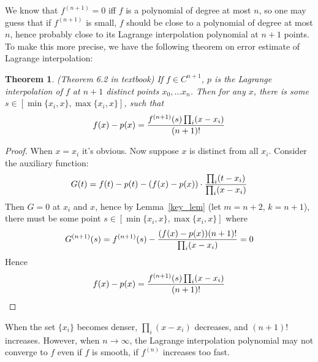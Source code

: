 \documentclass[20pt]{article} %
\theoremstyle{break}
\newtheorem{thm}[definition]{Theorem}
\begin{document}
  We know that $f^{(n+1)}=0$ iff $f$ is a polynomial of degree at most $n$, so one may guess that if $f^{(n+1)}$ is small, $f$ should be close to a polynomial of degree at most $n$, hence probably close to its Lagrange interpolation polynomial at $n+1$ points. To make this more precise, we have the following theorem on error estimate of Lagrange interpolation:
\begin{thm}\label{err_lag} (Theorem 6.2 in textbook) If $f\in C^{n+1}$, $p$ is the Lagrange interpolation of $f$ at $n+1$ distinct points $x_0,\dots x_n$. Then for any $x$, there is some $s\in[\min\{x_i, x\}, \max\{x_i, x\}]$, such that
  \[f(x)-p(x)={f^{(n+1)}(s)\prod_i(x-x_i)\over (n+1)!}\]
\end{thm}

\newpage

 \begin{proof} When $x=x_i$ it's obvious. Now suppose $x$ is distinct from all $x_i$. Consider the auxiliary function:
  \[G(t)=f(t)-p(t)-(f(x)-p(x))\cdot{\prod_i(t-x_i)\over \prod_i(x-x_i)}\]
  Then $G=0$ at $x_i$ and $x$, hence by Lemma~\ref{key_lem} (let $m=n+2$, $k=n+1$), there must be some point $s\in[\min\{x_i, x\}, \max\{x_i, x\}]$ where
  \[G^{(n+1)}(s)=f^{(n+1)}(s)-{(f(x)-p(x))(n+1)!\over \prod_i(x-x_i)}=0\]
  Hence
  \[f(x)-p(x)={f^{(n+1)}(s)\prod_i(x-x_i)\over (n+1)!}\]
\end{proof}

\newpage

When the set $\{x_i\}$ becomes denser, $\prod_i(x-x_i)$ decreases, and $(n+1)!$ increases. However, when $n\rightarrow \infty$, the Lagrange interpolation polynomial may not converge to $f$ even if $f$ is smooth, if $f^{(n)}$ increases too fast.
\end{document}
